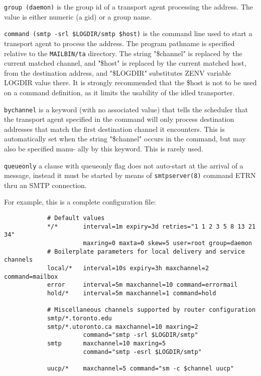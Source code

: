 {\tt group (daemon)}
is  the  group  id  of a transport agent processing the
address.  The value is either  numeric  (a  gid)  or a
group name.

{\tt command (smtp -srl \$LOGDIR/smtp \$host)}
is  the command line used to start a transport agent to
process the address. The program pathname is specified
relative  to the  {\tt MAILBIN/ta}  directory.   The  string
"\$channel" is replaced by the current matched  channel,
and  "\$host" is  replaced by the current matched host,
from the destination address, and "\$LOGDIR" substitutes
ZENV variable LOGDIR value there.  It is strongly 
recommended that the \$host is not to be used on a  command
definition, as it limits the usability of the idled transporter.

{\tt bychannel}
is a keyword (with no associated value) that tells  the
scheduler  that  the transport  agent specified in the
command will only process  destination  addresses  that
match  the  first  destination  channel  it encounters.
This is automatically set when  the  string  "\$channel"
occurs  in the command, but may also be specified manu-
ally by this keyword.  This is rarely used.

{\tt queueonly}
a clause with queueonly flag does not auto-start at the
arrival  of  a  message,  instead it must be started by
means of {\tt smtpserver(8)} command ETRN thru an  SMTP  connection.

For example, this is a complete configuration file:

\begin{tscreen}
\begin{verbatim}
            # Default values
            */*       interval=1m expiry=3d retries="1 1 2 3 5 8 13 21 34"
                      maxring=0 maxta=0 skew=5 user=root group=daemon
            # Boilerplate parameters for local delivery and service channels
            local/*   interval=10s expiry=3h maxchannel=2 command=mailbox
            error     interval=5m maxchannel=10 command=errormail
            hold/*    interval=5m maxchannel=1 command=hold

            # Miscellaneous channels supported by router configuration
            smtp/*.toronto.edu
            smtp/*.utoronto.ca maxchannel=10 maxring=2
                      command="smtp -srl $LOGDIR/smtp"
            smtp      maxchannel=10 maxring=5
                      command="smtp -esrl $LOGDIR/smtp"

            uucp/*    maxchannel=5 command="sm -c $channel uucp"
\end{verbatim}
\end{tscreen}


